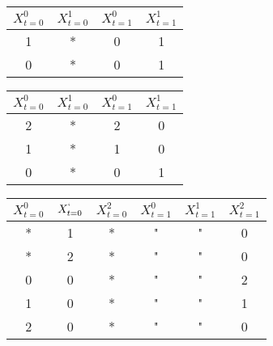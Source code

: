 \documentclass[../main.tex]{subfiles}
\begin{document}
\begin{table}
\begin{tabular}{| c c | c c |}
\hline
$X_{t=0}^0$ & $X_{t=0}^1$ & $X_{t=1}^0$ & $X_{t=1}^1$ \\
\hline
1&* &0 &1 \\
0&* &0 &1 \\
\hline
\end{tabular}
\end{table}

\begin{table}
\begin{tabular}{| c c | c c |}
\hline
$X_{t=0}^0$ & $X_{t=0}^1$ & $X_{t=1}^0$ & $X_{t=1}^1$ \\
\hline
2&* &2 &0 \\
1&* &1 &0 \\
0&* &0 &1 \\
\hline
\end{tabular}
\end{table}

\begin{table}
\begin{tabular}{| c c c | c c c |}
\hline
$X_{t=0}^0$ & $X_{t=0}^`$ & $X_{t=0}^2$ & $X_{t=1}^0$ & $X_{t=1}^1$ & $X_{t=1}^2$ \\
\hline
*&1 &* &" &" &0 \\
*&2 &* &" &" &0 \\
0&0 &* &" &" &2 \\
1&0 &* &" &" &1 \\
2&0 &* &" &" &0 \\
\hline
\end{tabular}
\end{table}
\end{document}
